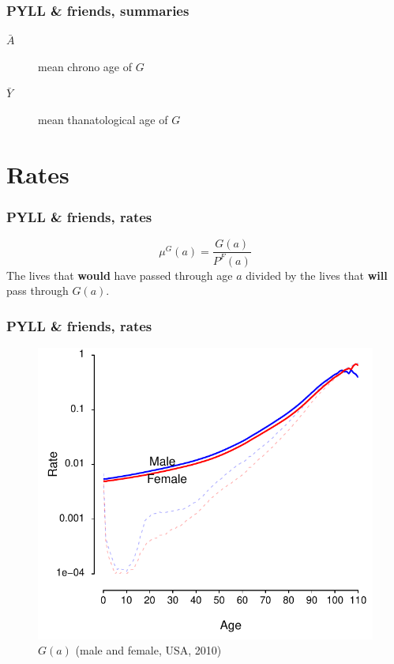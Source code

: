 \documentclass{beamer}
\begin{document}
\begin{frame}
\frametitle{PYLL \& friends, summaries}
\begin{description}
\item[$\bar{A}$] mean chrono age of $G$
\item[$\bar{Y}$] mean thanatological age of $G$
\end{description}
\end{frame}

\section{Rates}
\begin{frame}
\frametitle{PYLL \& friends, rates}
\begin{equation}
\mu^G(a) = \frac{G(a)}{P^F(a)}
\end{equation}
The lives that \textbf{would} have passed through age $a$ divided by the lives
that \textbf{will} pass through $G(a)$.
\end{frame}

\begin{frame}
\frametitle{PYLL \& friends, rates}
\vspace{-1cm}
\begin{figure}[b]
    \centering
    \includegraphics[scale=.7]{Figures/f14_linerate.pdf}
    \caption{$G(a)$ (male and female, USA, 2010)}
\end{figure} 
\end{frame}
\end{document}

